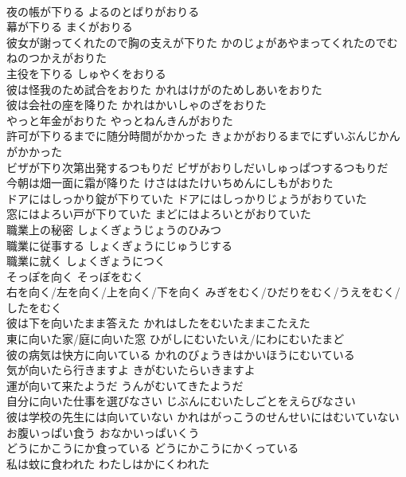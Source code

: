 \documentclass[8pt]{extreport}
\begin{document}
\begin{CJK}{UTF8}{min}
\\	夜の帳が下りる	よるのとばりがおりる	
\\	幕が下りる	まくがおりる	
\\	彼女が謝ってくれたので胸の支えが下りた	かのじょがあやまってくれたのでむねのつかえがおりた	
\\	主役を下りる	しゅやくをおりる	
\\	彼は怪我のため試合をおりた	かれはけがのためしあいをおりた	
\\	彼は会社の座を降りた	かれはかいしゃのざをおりた	
\\	やっと年金がおりた	やっとねんきんがおりた	
\\	許可が下りるまでに随分時間がかかった	きょかがおりるまでにずいぶんじかんがかかった	
\\	ビザが下り次第出発するつもりだ	ビザがおりしだいしゅっぱつするつもりだ	
\\	今朝は畑一面に霜が降りた	けさははたけいちめんにしもがおりた	
\\	ドアにはしっかり錠が下りていた	ドアにはしっかりじょうがおりていた	
\\	窓にはよろい戸が下りていた	まどにはよろいとがおりていた	
\\	職業上の秘密	しょくぎょうじょうのひみつ	
\\	職業に従事する	しょくぎょうにじゅうじする	
\\	職業に就く	しょくぎょうにつく	
\\	そっぽを向く	そっぽをむく	
\\	右を向く/左を向く/上を向く/下を向く	みぎをむく/ひだりをむく/うえをむく/したをむく	
\\	彼は下を向いたまま答えた	かれはしたをむいたままこたえた	
\\	東に向いた家/庭に向いた窓	ひがしにむいたいえ/にわにむいたまど	
\\	彼の病気は快方に向いている	かれのびょうきはかいほうにむいている	
\\	気が向いたら行きますよ	きがむいたらいきますよ	
\\	運が向いて来たようだ	うんがむいてきたようだ	
\\	自分に向いた仕事を選びなさい	じぶんにむいたしごとをえらびなさい	
\\	彼は学校の先生には向いていない	かれはがっこうのせんせいにはむいていない	
\\	お腹いっぱい食う	おなかいっぱいくう	
\\	どうにかこうにか食っている	どうにかこうにかくっている	
\\	私は蚊に食われた	わたしはかにくわれた	

\end{CJK}
\end{document}
